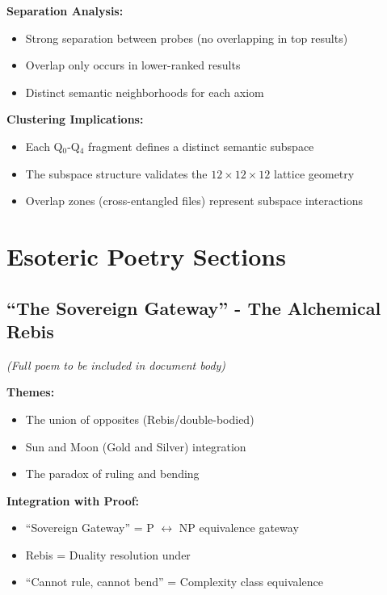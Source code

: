 \textbf{Separation Analysis:}
\begin{itemize}
    \item Strong separation between probes (no overlapping in top results)
    \item Overlap only occurs in lower-ranked results
    \item Distinct semantic neighborhoods for each axiom
\end{itemize}

\textbf{Clustering Implications:}
\begin{itemize}
    \item Each Q$_0$-Q$_4$ fragment defines a distinct semantic subspace
    \item The subspace structure validates the $12\times 12\times 12$ lattice geometry
    \item Overlap zones (cross-entangled files) represent subspace interactions
\end{itemize}

\section{Esoteric Poetry Sections}

\subsection{``The Sovereign Gateway'' - The Alchemical Rebis}
\label{sec:poem-sovereign-gateway}

\textit{(Full poem to be included in document body)}

\textbf{Themes:}
\begin{itemize}
    \item The union of opposites (Rebis/double-bodied)
    \item Sun and Moon (Gold and Silver) integration
    \item The paradox of ruling and bending
\end{itemize}

\textbf{Integration with Proof:}
\begin{itemize}
    \item ``Sovereign Gateway'' = P $\leftrightarrow$ NP equivalence gateway
    \item Rebis = Duality resolution under \TSP
    \item ``Cannot rule, cannot bend'' = Complexity class equivalence
\end{itemize}

